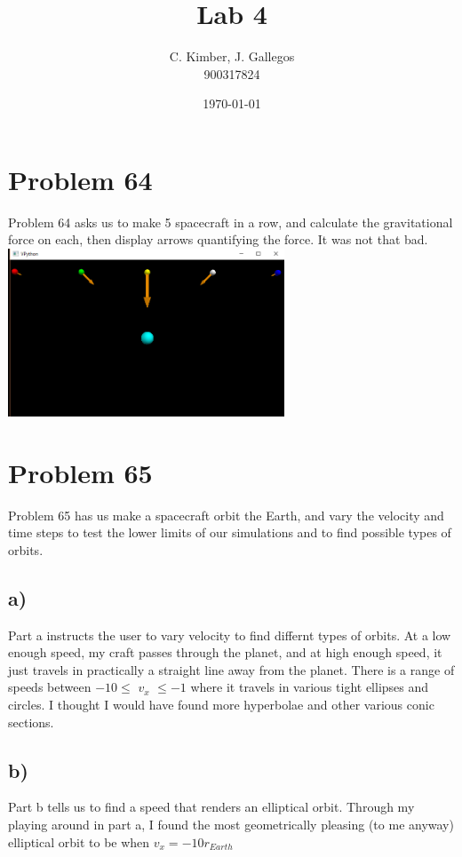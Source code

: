 \documentclass[a4paper,11pt]{article}
\begin{document}
\title{Lab 4}
\date{\today}
\author{C. Kimber, J. Gallegos\\900317824}
\maketitle
\newpage

\section{Problem 64}

Problem 64 asks us to make 5 spacecraft in a row, and calculate the gravitational force on each, then display arrows quantifying the force.
It was not that bad.
\centering
\includegraphics[height=5cm]{Untitled64.png}
\flushleft{}
\section{Problem 65}
Problem 65 has us make a spacecraft orbit the Earth, and vary the velocity and time steps to test the lower limits of our simulations and to find possible types of orbits.

\subsection{a)}
Part a instructs the user to vary velocity to find differnt types of orbits. At a low enough speed, my craft passes through the planet, and at high enough speed, it just travels in practically a straight line away from the planet. There is a range of speeds between $-10\leq$ $v_x$ $\leq-1$ where it travels in various tight ellipses and circles. I thought I would have found more hyperbolae and other various conic sections.

\subsection{b)}
Part b tells us to find a speed that renders an elliptical orbit. Through my playing around in part a, I found the most geometrically pleasing (to me anyway) elliptical orbit to be when $v_x = -10r_{Earth}$
\end{document}
